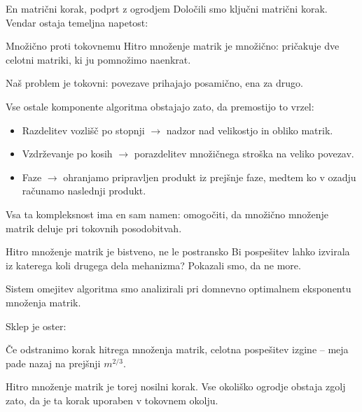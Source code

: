 \documentclass[aspectratio=169,10pt]{beamer}
\begin{document}
\begin{frame}{En matrični korak, podprt z ogrodjem}
  Določili smo ključni matrični korak. Vendar ostaja temeljna napetost:

  \vspace{0.5em}
  \begin{block}{Množično proti tokovnemu}
    Hitro množenje matrik je \alert{množično}: pričakuje dve celotni matriki, ki ju pomnožimo naenkrat.

    \medskip
    Naš problem je \alert{tokovni}: povezave prihajajo posamično, ena za drugo.
  \end{block}

  \vspace{0.6em}
  \alert{Vse ostale komponente algoritma obstajajo zato, da premostijo to vrzel:}
  \begin{itemize}
    \item Razdelitev vozlišč po stopnji $\to$ nadzor nad velikostjo in obliko matrik.
    \item Vzdrževanje po kosih $\to$ porazdelitev množičnega stroška na veliko povezav.
    \item Faze $\to$ ohranjamo pripravljen produkt iz prejšnje faze, medtem ko v ozadju računamo naslednji produkt.
  \end{itemize}

  \vspace{0.4em}
  Vsa ta kompleksnost ima en sam namen: omogočiti, da množično množenje matrik deluje pri tokovnih posodobitvah.
\end{frame}

\begin{frame}{Hitro množenje matrik je bistveno, ne le postransko}
  Bi pospešitev lahko izvirala iz katerega koli drugega dela mehanizma? Pokazali smo, da ne more.

  \vspace{0.8em}
  Sistem omejitev algoritma smo analizirali pri \alert{domnevno optimalnem} eksponentu množenja matrik.

  \vspace{0.8em}
  Sklep je oster:

  \vspace{0.4em}
  \begin{block}{\centering Če odstranimo korak hitrega množenja matrik, celotna pospešitev izgine -- meja pade nazaj na prejšnji $m^{2/3}$.}
  \end{block}

  \vspace{0.8em}
  Hitro množenje matrik je torej \alert{nosilni} korak. Vse okoliško ogrodje obstaja zgolj zato, da je ta korak uporaben v tokovnem okolju.
\end{frame}
\end{document}
